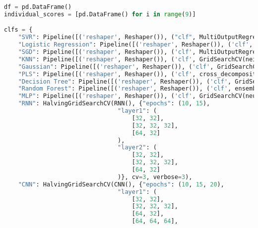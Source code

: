\begin{lstlisting}[label=python-listing,caption={Kod źródłowy},language=python]
df = pd.DataFrame()
individual_scores = [pd.DataFrame() for i in range(9)]

clfs = {
    "SVR": Pipeline([('reshaper', Reshaper()), ("clf", MultiOutputRegressor(GridSearchCV(svm.SVR(), {"kernel": ('linear', 'poly', 'rbf', 'sigmoid'), "C": (0.1, 1., 10), "epsilon": (0.01, 0.1, 1)})))]),
    "Logistic Regression": Pipeline([('reshaper', Reshaper()), ('clf', MultiOutputRegressor(GridSearchCV(linear_model.Ridge(), {"solver": ('svd', 'cholesky', 'lsqr', 'sparse_cg', 'sag', 'saga', 'lbfgs')})))]),
    "SGD": Pipeline([('reshaper', Reshaper()), ('clf', MultiOutputRegressor(GridSearchCV(linear_model.SGDRegressor(), {"penalty": ('l2', 'l1', 'elasticnet'), "loss": ('squared_error', 'huber', 'epsilon_insensitive', 'squared_epsilon_insensitive')})))]),
    "KNN": Pipeline([('reshaper', Reshaper()), ('clf', GridSearchCV(neighbors.KNeighborsRegressor(), {"weights": ("unifor", "distance"), "algorithm": ('ball_tree', 'kd_tree', 'brute'), "p": (1, 2, 3, 4)}))]),
    "Gaussian": Pipeline([('reshaper', Reshaper()), ('clf', GridSearchCV(gaussian_process.GaussianProcessRegressor(normalize_y=True), {"alpha": (1e-10, 1e-5, .01, .1), "n_restarts_optimizer": (0, 1, 2, 3, 4)}))]),
    "PLS": Pipeline([('reshaper', Reshaper()), ('clf', cross_decomposition.PLSRegression())]),
    "Decision Tree": Pipeline([('reshaper', Reshaper()), ('clf', GridSearchCV(tree.DecisionTreeRegressor(), {"splitter": ("best", "random"), "min_samples_leaf": (1, 2, 3, 4), "max_depth": (None, 5, 10, 15, 20)}))]),
    "Random Forest": Pipeline([('reshaper', Reshaper()), ('clf', ensemble.RandomForestRegressor())]),
    "MLP": Pipeline([('reshaper', Reshaper()), ('clf', GridSearchCV(neural_network.MLPRegressor(), {'activation': ('identity', 'logistic', 'tanh', 'relu'), "solver": ('lbfgs', 'sgd', 'adam')}))]),
    "RNN": HalvingGridSearchCV(RNN(), {"epochs": (10, 15), 
                                "layer1": (
                                    [32, 32],
                                    [32, 32, 32],
                                    [64, 32]
                                ), 
                                "layer2": (
                                    [32, 32],
                                    [32, 32, 32],
                                    [64, 32]
                                )}, cv=3, verbose=3),
    "CNN": HalvingGridSearchCV(CNN(), {"epochs": (10, 15, 20), 
                                "layer1": (
                                    [32, 32],
                                    [32, 32, 32],
                                    [64, 32],
                                    [64, 64, 64],

\end{lstlisting}
